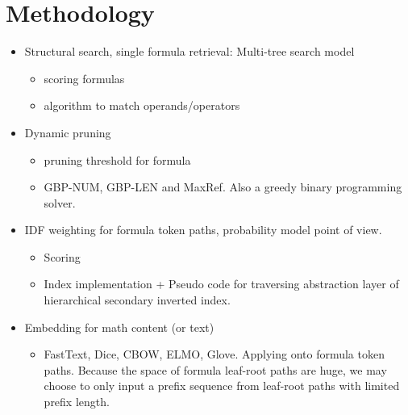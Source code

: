 \documentclass[11pt]{artikel3}
\begin{document}



\section{Methodology}

\begin{itemize}

\item Structural search, single formula retrieval: Multi-tree search model

    \begin{itemize}

    \item scoring formulas

    \item algorithm to match operands/operators

    \end{itemize}

\item Dynamic pruning

    \begin{itemize}

    \item pruning threshold for formula

    \item GBP-NUM, GBP-LEN and MaxRef. Also a greedy binary programming solver.

    \end{itemize}

\item IDF weighting for formula token paths, probability model point of view.

    \begin{itemize}

    \item Scoring

    \item Index implementation + Pseudo code for traversing abstraction layer of hierarchical secondary inverted index.

    \end{itemize}

\item Embedding for math content (or text)

    \begin{itemize}

    \item FastText, Dice, CBOW, ELMO, Glove. Applying onto formula token paths.
	Because the space of formula leaf-root paths are huge, we may choose to only input a prefix sequence from leaf-root paths with limited prefix length.


\end{itemize}
\end{itemize}
\end{document}
